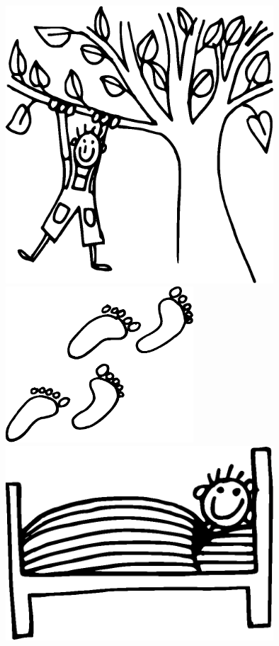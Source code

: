 \documentclass[11pt,a4paper,twoside]{article}
\begin{document}
\pagebreak
\vfil
\hspace*{3cm}\includegraphics[width=10cm]{7.eps}
\vfil
\vfil
\hspace*{1cm}\includegraphics[width=7cm]{8.eps}
\vfil
\vfil
\pagebreak
\vfil
\hspace*{1cm}\includegraphics[width=10cm]{9.eps}
\end{document}
